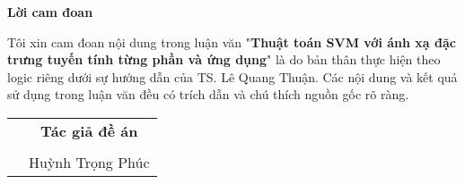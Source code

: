 \newpage
\thispagestyle{empty}
\begin{center}
    \Large{\textbf{Lời cam đoan}}
\end{center}
\vspace{.8cm}

Tôi xin cam đoan nội dung trong luận văn "\textbf{Thuật toán SVM với ánh xạ đặc trưng tuyến tính từng phần và ứng dụng}" là do bản thân thực hiện theo logic riêng dưới sự hướng dẫn của TS. Lê Quang Thuận. Các nội dung và kết quả sử dụng trong luận văn đều có trích dẫn và chú thích nguồn gốc rõ ràng.
\vspace{2cm}

\begin{flushright}
    \begin{tabular}{cc}
         & \hspace{2.3cm} \textbf{Tác giả đề án} \\
         & \vspace{1.5cm} \\
         & \hspace{2.3cm} Huỳnh Trọng Phúc
    \end{tabular}
\end{flushright}